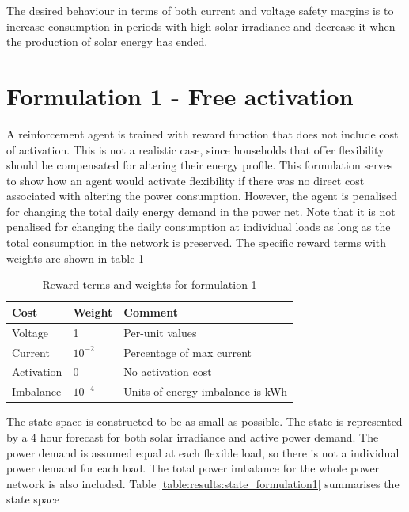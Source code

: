 \documentclass[class=book, crop=false]{standalone}
\begin{document}
The desired behaviour in terms of both current and voltage safety margins is to increase consumption in periods with high solar irradiance and decrease it when the production of solar energy has ended.


\section{Formulation 1 - Free activation}
A reinforcement agent is trained with reward function that does not include cost of activation. This is not a realistic case, since households that offer flexibility should be compensated for altering their energy profile. This formulation serves to show how an agent would activate flexibility if there was no direct cost associated with altering the power consumption. However, the agent is penalised for changing the total daily energy demand in the power net. Note that it is not penalised for changing the daily consumption at individual loads as long as the total consumption in the network is preserved. The specific reward terms with weights are shown in table \ref{table:results:reward_formulation1}

\begin{table}[ht]
\centering
\caption{Reward terms and weights for formulation 1}
\label{table:results:reward_formulation1}
\begin{tabular}{l|ll}

Cost  & Weight & Comment
\\ 
\hline
Voltage &
1 &
Per-unit values
\\
Current &
$10^{-2}$ &
Percentage of max current 
\\
Activation &
0&
No activation cost
\\
Imbalance &
$10^{-4}$&
Units of energy imbalance is kWh
\\
\hline
\end{tabular}
\end{table}
The state space is constructed to be as small as possible. The state is represented by a 4 hour forecast for both solar irradiance and active power demand. The power demand is assumed equal at each flexible load, so there is not a individual power demand for each load. The total power imbalance for the whole power network is also included. Table \ref{table:results:state_formulation1} summarises the state space
\end{document}
